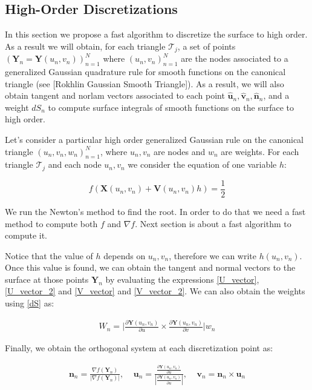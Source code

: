\documentclass[11pt]{article}
\newcommand\bn{\boldsymbol n}
\newcommand\bX{\boldsymbol X}
\newcommand\bY{\boldsymbol Y}
\newcommand\bV{\boldsymbol V}
\newcommand\bu{\boldsymbol u}
\newcommand\bv{\boldsymbol v}
\begin{document}
\subsection{High-Order Discretizations}
\label{sec:disc}




In this section we propose a fast algorithm to discretize the surface to high order. As a result we will obtain, for each triangle $\mathcal{T}_j$, a set of points $(\bY_n=\bY(u_n,v_n))_{n=1}^N$ where $(u_n,v_n)_{n=1}^N$ are the nodes associated to a generalized Gaussian quadrature rule for smooth functions on the canonical triangle (see [Rokhlin Gaussian Smooth Triangle]). As a result, we will also obtain tangent and norlam vectors associated to each point $\hat{\bu}_n,\hat{\bv}_n,\hat{\bn}_n$, and a weight $dS_n$ to compute surface integrals of smooth functions on the surface to high order.

Let's consider a particular high order generalized Gaussian rule on the canonical triangle $(u_n,v_n,w_n)_{n=1}^N$, where $u_n,v_n$ are nodes and $w_n$ are weights. For each triangle $\mathcal{T}_j$ and each node $u_n,v_n$ we consider the equation of one variable $h$:

\begin{equation}\label{newtoneq}
f(\bX(u_n,v_n)+\bV(u_n,v_n)h)=\frac{1}{2}
\end{equation}

We run the Newton's method to find the root. In order to do that we need a fast method to compute both $f$ and $\nabla f$. Next section is about a fast algorithm to compute it.

Notice that the value of $h$ depends on $u_n,v_n$, therefore we can write $h(u_n,v_n)$. Once this value is found, we can obtain the tangent and normal vectors to the surface at those points $\bY_n$ by evaluating the expressions \ref{U_vector}, \ref{U_vector_2} and \ref{V_vector} and \ref{V_vector_2}. We can also obtain the weights using \ref{dS} as:

\begin{equation}\label{dS_n}
\begin{aligned}
 W_n=\Bigg|\frac{\partial\bY(u_n,v_n)}{\partial u}\times\frac{\partial\bY(u_n,v_n)}{\partial v}\Bigg|w_n
\end{aligned}
\end{equation}

Finally, we obtain the orthogonal system at each discretization point as:

\begin{equation}
\begin{aligned}
\bn_n=\frac{\nabla f(\bY_n)}{|\nabla f(\bY_n)|},\  \  \  \   \ 
\bu_n=\frac{\frac{\partial\bY(u_n,v_n)}{\partial u}}{|\frac{\partial\bY(u_n,v_n)}{\partial u}|},\  \  \  \   \
\bv_n=\bn_n\times\bu_n
\end{aligned}
\end{equation}
\end{document}
